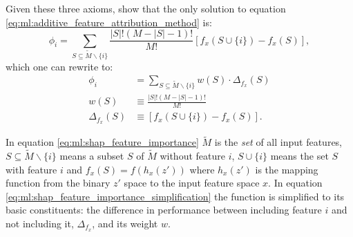 Given these three axioms, \citet{Lundberg:2017} show that the only solution to equation \eqref{eq:ml:additive_feature_attribution_method} is:
\begin{equation}
  \label{eq:ml:shap_feature_importance}
    \phi_i = \sum_{S \subseteq \widetilde{M} \backslash \{i\}} \frac{|S|!(M-|S|-1)!}{M!} \left[ f_x(S \cup \{i\}) - f_x(S) \right] ,
\end{equation}
which one can rewrite to:
\begin{equation}
  \label{eq:ml:shap_feature_importance_simplification}
  \begin{split}
    \phi_i        &= \sum_{S \subseteq \widetilde{M} \backslash \{i\}} w(S) \cdot \Delta_{f_x}(S) \\
    w(S)             &\equiv \frac{|S|!(M-|S|-1)!}{M!} \\
    \Delta_{f_x}(S)  &\equiv \left[ f_x(S \cup \{i\}) - f_x(S) \right].
  \end{split}
\end{equation}


In equation \eqref{eq:ml:shap_feature_importance} $\widetilde{M}$ is the \emph{set} of all input features, $S \subseteq \widetilde{M} \backslash \{i\}$ means a subset $S$ of $\widetilde{M}$ without feature $i$, $S \cup \{i\}$ means the set $S$ with feature $i$ and $f_x(S) = f(h_x(z'))$ where $h_x(z')$ is the mapping function from the binary $z'$ space to the input feature space $x$. In equation \eqref{eq:ml:shap_feature_importance_simplification} the function is simplified to its basic constituents: the difference in performance  between including feature $i$ and not including it, $\Delta_{f_x}$, and its weight $w$. 

